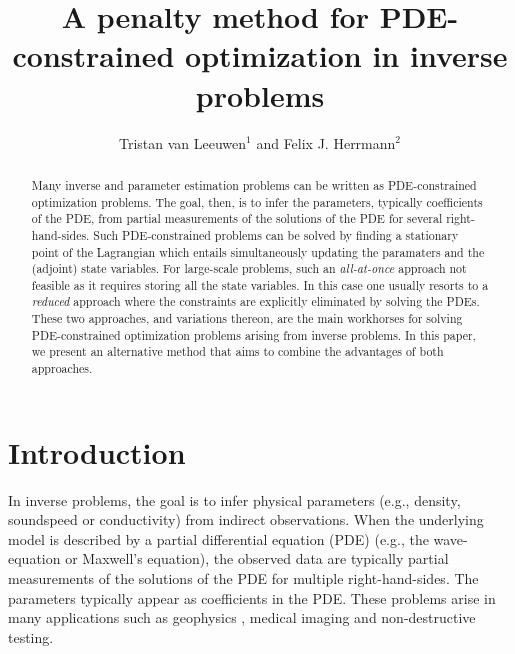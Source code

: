 \documentclass{iopart}
\begin{document}
\title[A penalty method for inverse problems]{A penalty method for PDE-constrained optimization in inverse problems}
\author{Tristan van Leeuwen$^1$ and Felix J. Herrmann$^2$}
\address{$^1$Department of Mathematics, Utrecht University, Utrecht, the Netherlands\\
$^2$ Dept. of Earth, Ocean and Atmospheric Sciences, University of British Columbia, Vancouver (BC), Canada.}

\begin{abstract}
Many inverse and parameter estimation problems can be written as PDE-constrained optimization problems. 
The goal, then, is to infer the parameters, typically coefficients of the PDE, from partial measurements
of the solutions of the PDE for several right-hand-sides. Such PDE-constrained
problems can be solved by finding a stationary point of the Lagrangian which entails simultaneously updating
the paramaters and the (adjoint) state variables. 
For large-scale problems, 
such an \emph{all-at-once} approach not feasible as it requires storing all the state variables. In this case one usually
resorts to a \emph{reduced} approach where the constraints are explicitly eliminated by solving the PDEs. These two approaches, 
and variations thereon, are the main workhorses for solving PDE-constrained optimization problems arising from inverse problems.
In this paper, we present an alternative method that aims to combine the advantages of both approaches.


\end{abstract}

\maketitle

\section{Introduction}
In inverse problems, the goal is to infer physical parameters (e.g., density, soundspeed or conductivity) 
from indirect observations. When the underlying model is described by a partial differential equation (PDE)
(e.g., the wave-equation or Maxwell's equation), the observed data are typically partial measurements
of the solutions of the PDE for multiple right-hand-sides. The parameters typically appear as coefficients in the PDE. 
These problems arise in many applications such as
geophysics \cite{Haber2004,Epanomeritakis08}, medical imaging \cite{Abdoulaev2005} and non-destructive testing.
\end{document}
